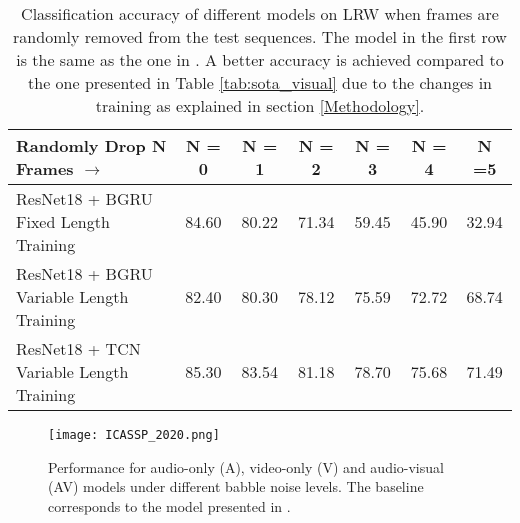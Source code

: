 \documentclass{article}
\begin{document}
\begin{table*}[htb]
\begin{center}
\begin{tabular}{|l|c|c|c|c|c|c|}
\hline
Randomly Drop N Frames $\xrightarrow{}$ & N = 0 & N = 1 & N = 2 & N = 3 & N = 4 & N =5 \\
\hline
ResNet18 + BGRU Fixed Length Training & 84.60 & 80.22  & 71.34 & 59.45 & 45.90 & 32.94 \\
ResNet18 + BGRU Variable Length Training & 82.40 & 80.30 & 78.12 & 75.59 & 72.72 & 68.74 \\
ResNet18 + TCN Variable Length Training & 85.30 & 83.54 & 81.18 & 78.70 & 75.68 & 71.49 \\
\hline
\end{tabular}
\vspace{-2mm}
\end{center}
\caption{Classification accuracy of different models on LRW when frames are randomly removed from the test sequences. The model in the first row is the same as the one in \cite{petridis18}. A better accuracy is achieved compared to the one presented in Table \ref{tab:sota_visual} due to the changes in training as explained in section \ref{Methodology}.   }
\label{tab:frame_removal}
\end{table*}

\begin{figure}[ht]
    \begin{center}
    \texttt{[image: ICASSP\_2020.png]}
    \end{center}
    \caption{Performance for audio-only (A), video-only (V) and audio-visual (AV) models under different babble noise levels. The baseline corresponds to the model presented in \cite{petridis18}. }
    \label{fig:av_results}
\end{figure}
\end{document}
